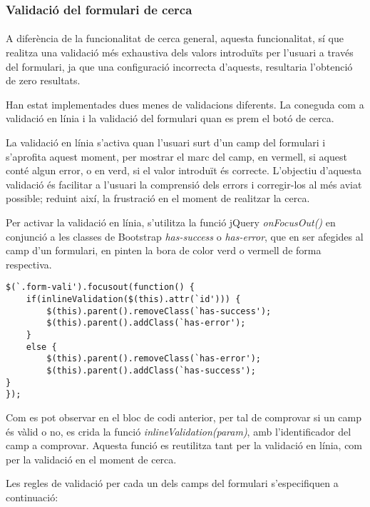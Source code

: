 \subsubsection{Validació del formulari de cerca}

\paragraph{}
A diferència de la funcionalitat de cerca general, aquesta funcionalitat, sí que realitza una validació més exhaustiva dels valors introduïts per l'usuari a través del formulari, ja que una configuració incorrecta d'aquests, resultaria l’obtenció de zero resultats.

Han estat implementades dues menes de validacions diferents. La coneguda com a validació en línia i la validació del formulari quan es prem el botó de cerca.

La validació en línia s'activa quan l'usuari surt d'un camp del formulari i s'aprofita aquest moment, per mostrar el marc del camp, en vermell, si aquest conté algun error, o en verd, si el valor introduït és correcte. L'objectiu d'aquesta validació és facilitar a l'usuari la comprensió dels errors i corregir-los al més aviat possible; reduint així, la frustració en el moment de realitzar la cerca.

Per activar la validació en línia, s'utilitza la funció jQuery \emph{onFocusOut()} en conjunció a les classes de Bootstrap \emph{has-success} o \emph{has-error}, que en ser afegides al camp d'un formulari, en pinten la bora de color verd o vermell de forma respectiva.

\begin{lstlisting}[style=rawOwn,caption={Activació de la validació en línia}]
$(`.form-vali').focusout(function() {
    if(inlineValidation($(this).attr(`id'))) {
        $(this).parent().removeClass(`has-success');
        $(this).parent().addClass(`has-error');
    }
    else {
        $(this).parent().removeClass(`has-error');
        $(this).parent().addClass(`has-success');
}
});
\end{lstlisting}

Com es pot observar en el bloc de codi anterior, per tal de comprovar si un camp és vàlid o no, es crida la funció \emph{inlineValidation(param)}, amb l’identificador del camp a comprovar. Aquesta funció es reutilitza tant per la validació en línia, com per la validació en el moment de cerca.

Les regles de validació per cada un dels camps del formulari s'especifiquen a continuació:

